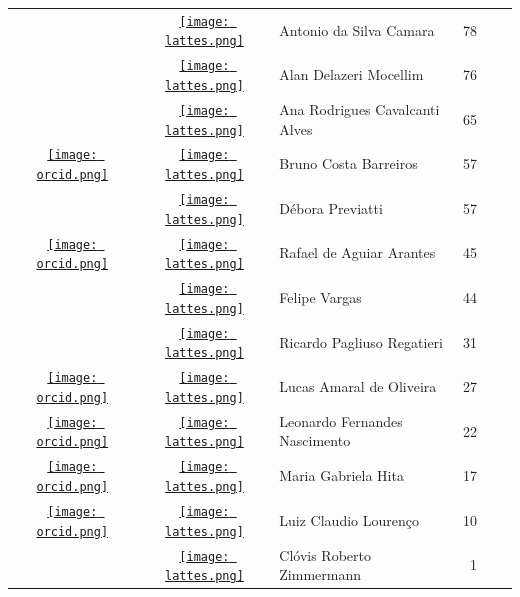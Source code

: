 \documentclass[12pt,brazil]{article}\usepackage[]{graphicx}\usepackage[]{xcolor}
\begin{document}
\begin{longtable}{cclrll}
 & \href{http://lattes.cnpq.br/4868229187967997}{\texttt{[image: lattes.png]}} & Antonio da Silva Camara & 78 &  &  \\

 & \href{http://lattes.cnpq.br/0264933519544511}{\texttt{[image: lattes.png]}} & Alan Delazeri Mocellim & 76 &  &  \\

 & \href{http://lattes.cnpq.br/6506286038414113}{\texttt{[image: lattes.png]}} & Ana Rodrigues Cavalcanti Alves & 65 &  &  \\

\href{https://orcid.org/0000-0002-7609-0001}{\texttt{[image: orcid.png]}} & \href{http://lattes.cnpq.br/5274872727972308}{\texttt{[image: lattes.png]}} & Bruno Costa Barreiros & 57 &  &  \\

 & \href{http://lattes.cnpq.br/0212366491733548}{\texttt{[image: lattes.png]}} & Débora Previatti & 57 &  &  \\

\href{https://orcid.org/0000-0002-3953-9340}{\texttt{[image: orcid.png]}} & \href{http://lattes.cnpq.br/9187555671886787}{\texttt{[image: lattes.png]}} & Rafael de Aguiar Arantes & 45 &  &  \\

 & \href{http://lattes.cnpq.br/6150854485177629}{\texttt{[image: lattes.png]}} & Felipe Vargas & 44 &  &  \\

 & \href{http://lattes.cnpq.br/3077741187299322}{\texttt{[image: lattes.png]}} & Ricardo Pagliuso Regatieri & 31 &  &  \\

\href{https://orcid.org/0000-0002-1272-4722}{\texttt{[image: orcid.png]}} & \href{http://lattes.cnpq.br/0974813858531390}{\texttt{[image: lattes.png]}} & Lucas Amaral de Oliveira & 27 &  &  \\

\href{https://orcid.org/0000-0003-2929-1115}{\texttt{[image: orcid.png]}} & \href{http://lattes.cnpq.br/7141811368487014}{\texttt{[image: lattes.png]}} & Leonardo Fernandes Nascimento & 22 &  &  \\

\href{https://orcid.org/0000-0002-5865-7334}{\texttt{[image: orcid.png]}} & \href{http://lattes.cnpq.br/2408407341179334}{\texttt{[image: lattes.png]}} & Maria Gabriela Hita & 17 &  &  \\

\href{https://orcid.org/0000-0002-6781-0230}{\texttt{[image: orcid.png]}} & \href{http://lattes.cnpq.br/9249653080596163}{\texttt{[image: lattes.png]}} & Luiz Claudio Lourenço & 10 &  &  \\

 & \href{http://lattes.cnpq.br/7132903863839824}{\texttt{[image: lattes.png]}} & Clóvis Roberto Zimmermann & 1 &  &  \\


\bottomrule
\end{longtable}
\end{document}
